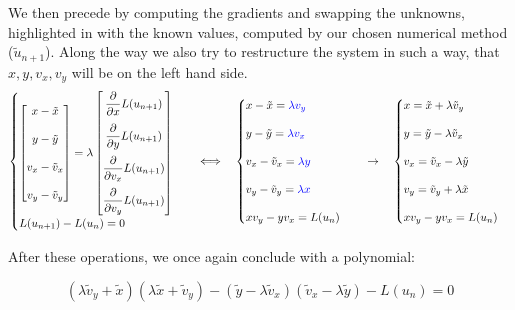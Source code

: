 \documentclass[11pt]{article}
\begin{document}
We then precede by computing the gradients and swapping the unknowns, highlighted in {\color{blue}{blue}} with the known values, computed by our chosen numerical method ($\tilde{u} _{n+1}$). Along the way we also try to restructure the system in such a way, that $x, y, v_x, v_y$ will be on the left hand side.
\[
\begin{cases}
\begin{bmatrix}
x - \tilde{x} \\[10pt]
y - \tilde{y} \\[10pt]
v_x - \tilde{v}_x \\[10pt]
v_y - \tilde{v}_y
\end{bmatrix}
=
\lambda
\begin{bmatrix}
\dfrac{\partial}{\partial x} L(u_{n+1}) \\[10pt]
\dfrac{\partial}{\partial y} L(u_{n+1}) \\[10pt]
\dfrac{\partial}{\partial v_x} L(u_{n+1}) \\[10pt]
\dfrac{\partial}{\partial v_y} L(u_{n+1})
\end{bmatrix} \\[17pt]
L(u_{n+1}) - L(u_n) = 0
\end{cases}
\quad \Longleftrightarrow \quad
\begin{cases}
x - \tilde{x} = \color{blue}{\lambda v_y} \\[10pt]
y - \tilde{y} = \color{blue}{\lambda v_x} \\[10pt]
v_x - \tilde{v}_x = \color{blue}{\lambda y} \\[10pt]
v_y - \tilde{v}_y = \color{blue}{\lambda x} \\[10pt]
x v_y - y v_x = L(u_n)
\end{cases}
\quad \rightarrow \quad
\begin{cases}
x = \tilde{x} + \lambda \tilde{v}_y \\[10pt]
y = \tilde{y} - \lambda \tilde{v}_x \\[10pt]
v_x = \tilde{v}_x - \lambda \tilde{y} \\[10pt]
v_y = \tilde{v}_y + \lambda \tilde{x} \\[10pt]
x v_y - y v_x = L(u_n)
\end{cases}
\]

After these operations, we once again conclude with a polynomial:

\[
(\lambda \tilde{v}_y + \tilde{x})(\lambda \tilde{x} + \tilde{v}_y)
-
(\tilde{y} - \lambda \tilde{v}_x)(\tilde{v}_x - \lambda \tilde{y})
-
L(u_n) = 0
\]
\end{document}
